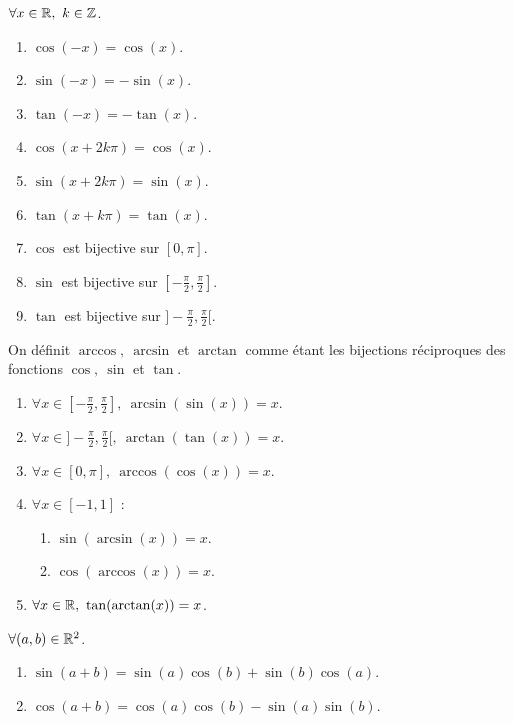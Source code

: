 \begin{proposition}
	$\forall x \in \mathbb{R},\ k \in \mathbb{Z}$.
	\begin{enumerate}
		\item $\cos(-x) = \cos(x)$.
		\item $\sin(-x) = -\sin(x)$.
		\item $\tan(-x) = -\tan(x)$.
		\item $\cos(x + 2k\pi) = \cos(x)$.
		\item $\sin(x + 2k\pi) = \sin(x)$.
		\item $\tan(x + k\pi) = \tan(x)$.
		\item $\cos$ est bijective sur $[0, \pi]$.
		\item $\sin$ est bijective sur $[-\frac{\pi}{2}, \frac{\pi}{2}]$.
		\item $\tan$ est bijective sur $]-\frac{\pi}{2}, \frac{\pi}{2}[$.
	\end{enumerate}
\end{proposition}

\begin{definition}
	On définit $\arccos,\ \arcsin$ et $\arctan$ comme étant les bijections réciproques des fonctions $\cos,\ \sin$ et $\tan$.
\end{definition}

\begin{proposition}
    \begin{enumerate}
    	\item $\forall x \in [-\frac{\pi}{2}, \frac{\pi}{2}],\ \arcsin(\sin(x)) = x$.
        \item $\forall x \in ]-\frac{\pi}{2}, \frac{\pi}{2}[,\ \arctan(\tan(x)) = x$.
        \item $\forall x \in [0, \pi],\ \arccos(\cos(x)) = x$.
        \item $\forall x \in [-1, 1]$ :
        \begin{multicols}{2}
            \begin{enumerate}
                \item $\sin(\arcsin(x)) = x$.
                \item $\cos(\arccos(x)) = x$.
            \end{enumerate}
        \end{multicols}
        \item $\forall x \in \mathbb{R},\ \tan(\arctan(x)) = x$.
    \end{enumerate}
\end{proposition}

\begin{proposition}
	$\forall (a, b) \in \mathbb{R}^2$.
    \begin{multicols}{2}
        \begin{enumerate}
            \item $\sin(a + b) = \sin(a) \cos(b) + \sin(b) \cos(a)$.
            \item $\cos(a + b) = \cos(a) \cos(b) - \sin(a) \sin(b)$.
        \end{enumerate}
    \end{multicols}
\end{proposition}

